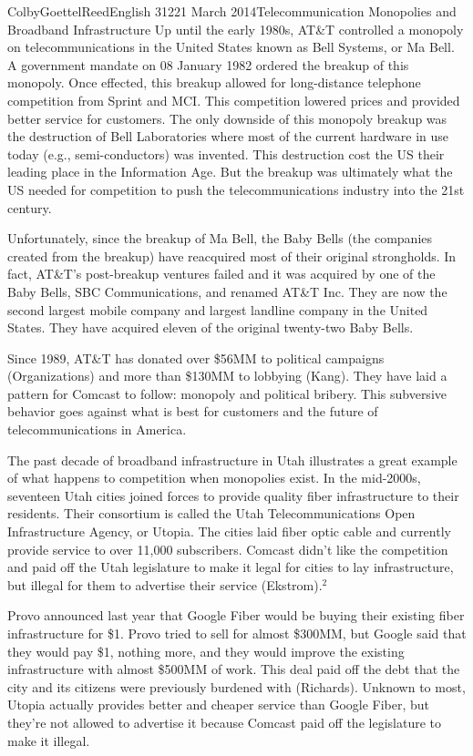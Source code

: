 \documentclass[12pt]{article}
\begin{document}
\begin{mla}{Colby}{Goettel}{Reed}{English 312}{21 March 2014}{Telecommunication Monopolies and Broadband Infrastructure}
Up until the early 1980s, AT\&T controlled a monopoly on telecommunications in the United States known as Bell Systems, or Ma Bell. A government mandate on 08 January 1982 ordered the breakup of this monopoly. Once effected, this breakup allowed for long-distance telephone competition from Sprint and MCI. This competition lowered prices and provided better service for customers. The only downside of this monopoly breakup was the destruction of Bell Laboratories where most of the current hardware in use today (e.g., semi-conductors) was invented. This destruction cost the US their leading place in the Information Age. But the breakup was ultimately what the US needed for competition to push the telecommunications industry into the 21st century.

Unfortunately, since the breakup of Ma Bell, the Baby Bells (the companies created from the breakup) have reacquired most of their original strongholds. In fact, AT\&T's post-breakup ventures failed and it was acquired by one of the Baby Bells, SBC Communications, and renamed AT\&T Inc. They are now the second largest mobile company and largest landline company in the United States. They have acquired eleven of the original twenty-two Baby Bells.

Since 1989, AT\&T has donated over \$56MM to political campaigns (Organizations) and more than \$130MM to lobbying (Kang). They have laid a pattern for Comcast to follow: monopoly and political bribery. This subversive behavior goes against what is best for customers and the future of telecommunications in America.

The past decade of broadband infrastructure in Utah illustrates a great example of what happens to competition when monopolies exist. In the mid-2000s, seventeen Utah cities joined forces to provide quality fiber infrastructure to their residents. Their consortium is called the Utah Telecommunications Open Infrastructure Agency, or Utopia. The cities laid fiber optic cable and currently provide service to over 11,000 subscribers. Comcast didn't like the competition and paid off the Utah legislature to make it legal for cities to lay infrastructure, but illegal for them to advertise their service (Ekstrom).$^2$

Provo announced last year that Google Fiber would be buying their existing fiber infrastructure for \$1. Provo tried to sell for almost \$300MM, but Google said that they would pay \$1, nothing more, and they would improve the existing infrastructure with almost \$500MM of work. This deal paid off the debt that the city and its citizens were previously burdened with (Richards). Unknown to most, Utopia actually provides better and cheaper service than Google Fiber, but they're not allowed to advertise it because Comcast paid off the legislature to make it illegal.


\end{mla}
\end{document}
